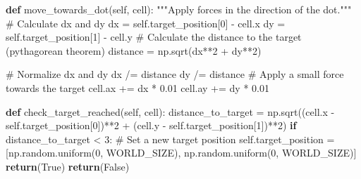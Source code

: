 \documentclass[
  letterpaper,
  DIV=11,
  numbers=noendperiod]{scrreprt}
\newenvironment{Shaded}{\begin{snugshade}}{\end{snugshade}}
\newcommand{\CommentTok}[1]{\textcolor[rgb]{0.37,0.37,0.37}{#1}}
\newcommand{\ControlFlowTok}[1]{\textcolor[rgb]{0.00,0.23,0.31}{\textbf{#1}}}
\newcommand{\DecValTok}[1]{\textcolor[rgb]{0.68,0.00,0.00}{#1}}
\newcommand{\FloatTok}[1]{\textcolor[rgb]{0.68,0.00,0.00}{#1}}
\newcommand{\KeywordTok}[1]{\textcolor[rgb]{0.00,0.23,0.31}{\textbf{#1}}}
\newcommand{\NormalTok}[1]{\textcolor[rgb]{0.00,0.23,0.31}{#1}}
\newcommand{\OperatorTok}[1]{\textcolor[rgb]{0.37,0.37,0.37}{#1}}
\newcommand{\VariableTok}[1]{\textcolor[rgb]{0.07,0.07,0.07}{#1}}
\theoremstyle{definition}
\theoremstyle{remark}
\begin{document}
\begin{tcolorbox}
\begin{Shaded}
\begin{Highlighting}[]
    \KeywordTok{def}\NormalTok{ move\_towards\_dot(}\VariableTok{self}\NormalTok{, cell):}
        \CommentTok{"""Apply forces in the direction of the dot."""}
        \CommentTok{\# Calculate dx and dy}
\NormalTok{        dx }\OperatorTok{=} \VariableTok{self}\NormalTok{.target\_position[}\DecValTok{0}\NormalTok{] }\OperatorTok{{-}}\NormalTok{ cell.x}
\NormalTok{        dy }\OperatorTok{=} \VariableTok{self}\NormalTok{.target\_position[}\DecValTok{1}\NormalTok{] }\OperatorTok{{-}}\NormalTok{ cell.y}
        \CommentTok{\# Calculate the distance to the target (pythagorean theorem)}
\NormalTok{        distance }\OperatorTok{=}\NormalTok{ np.sqrt(dx}\OperatorTok{**}\DecValTok{2} \OperatorTok{+}\NormalTok{ dy}\OperatorTok{**}\DecValTok{2}\NormalTok{)}
        
        \CommentTok{\# Normalize dx and dy }
\NormalTok{        dx }\OperatorTok{/=}\NormalTok{ distance}
\NormalTok{        dy }\OperatorTok{/=}\NormalTok{ distance}
        \CommentTok{\# Apply a small force towards the target}
\NormalTok{        cell.ax }\OperatorTok{+=}\NormalTok{ dx }\OperatorTok{*} \FloatTok{0.01}
\NormalTok{        cell.ay }\OperatorTok{+=}\NormalTok{ dy }\OperatorTok{*} \FloatTok{0.01}
    
    \KeywordTok{def}\NormalTok{ check\_target\_reached(}\VariableTok{self}\NormalTok{, cell):}
\NormalTok{        distance\_to\_target }\OperatorTok{=}\NormalTok{ np.sqrt((cell.x }\OperatorTok{{-}} \VariableTok{self}\NormalTok{.target\_position[}\DecValTok{0}\NormalTok{])}\OperatorTok{**}\DecValTok{2} \OperatorTok{+}
\NormalTok{                                         (cell.y }\OperatorTok{{-}} \VariableTok{self}\NormalTok{.target\_position[}\DecValTok{1}\NormalTok{])}\OperatorTok{**}\DecValTok{2}\NormalTok{)}
        \ControlFlowTok{if}\NormalTok{ distance\_to\_target }\OperatorTok{\textless{}} \DecValTok{3}\NormalTok{:}
            \CommentTok{\# Set a new target position}
            \VariableTok{self}\NormalTok{.target\_position }\OperatorTok{=}\NormalTok{ [np.random.uniform(}\DecValTok{0}\NormalTok{, WORLD\_SIZE), np.random.uniform(}\DecValTok{0}\NormalTok{, WORLD\_SIZE)]}
            \ControlFlowTok{return}\NormalTok{(}\VariableTok{True}\NormalTok{)}
        \ControlFlowTok{return}\NormalTok{(}\VariableTok{False}\NormalTok{)}
    

\end{Highlighting}
\end{Shaded}
\end{tcolorbox}
\end{document}
